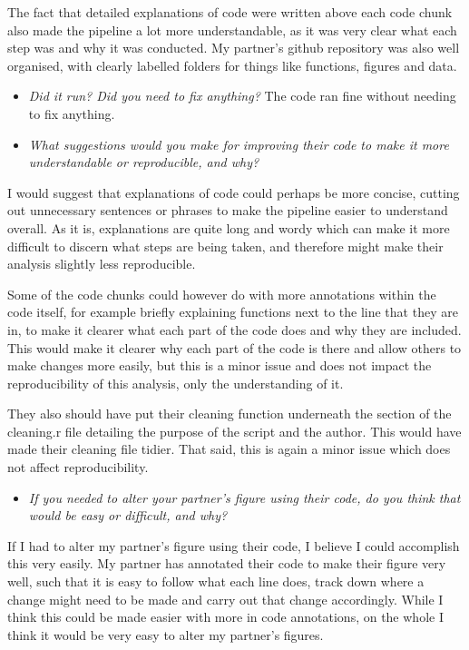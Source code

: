 \documentclass[
]{article}
\providecommand{\tightlist}{%
  \setlength{\itemsep}{0pt}\setlength{\parskip}{0pt}}
\begin{document}
The fact that detailed explanations of code were written above each code
chunk also made the pipeline a lot more understandable, as it was very
clear what each step was and why it was conducted. My partner's github
repository was also well organised, with clearly labelled folders for
things like functions, figures and data.

\begin{itemize}
\item
  \emph{Did it run? Did you need to fix anything?} The code ran fine
  without needing to fix anything.
\item
  \emph{What suggestions would you make for improving their code to make
  it more understandable or reproducible, and why?}
\end{itemize}

I would suggest that explanations of code could perhaps be more concise,
cutting out unnecessary sentences or phrases to make the pipeline easier
to understand overall. As it is, explanations are quite long and wordy
which can make it more difficult to discern what steps are being taken,
and therefore might make their analysis slightly less reproducible.

Some of the code chunks could however do with more annotations within
the code itself, for example briefly explaining functions next to the
line that they are in, to make it clearer what each part of the code
does and why they are included. This would make it clearer why each part
of the code is there and allow others to make changes more easily, but
this is a minor issue and does not impact the reproducibility of this
analysis, only the understanding of it.

They also should have put their cleaning function underneath the section
of the cleaning.r file detailing the purpose of the script and the
author. This would have made their cleaning file tidier. That said, this
is again a minor issue which does not affect reproducibility.

\begin{itemize}
\tightlist
\item
  \emph{If you needed to alter your partner's figure using their code,
  do you think that would be easy or difficult, and why?}
\end{itemize}

If I had to alter my partner's figure using their code, I believe I
could accomplish this very easily. My partner has annotated their code
to make their figure very well, such that it is easy to follow what each
line does, track down where a change might need to be made and carry out
that change accordingly. While I think this could be made easier with
more in code annotations, on the whole I think it would be very easy to
alter my partner's figures.
\end{document}
